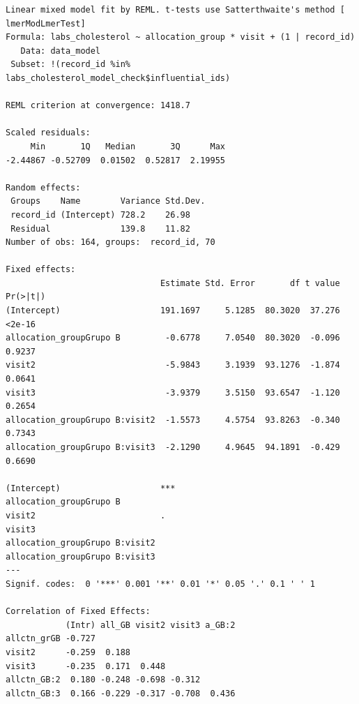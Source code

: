 \documentclass[
  letterpaper,
  DIV=11,
  numbers=noendperiod]{scrartcl}
\newenvironment{Shaded}{\begin{snugshade}}{\end{snugshade}}
\newcommand{\NormalTok}[1]{\textcolor[rgb]{0.00,0.23,0.31}{#1}}
\newcommand{\SpecialCharTok}[1]{\textcolor[rgb]{0.37,0.37,0.37}{#1}}
\begin{document}
\begin{verbatim}
Linear mixed model fit by REML. t-tests use Satterthwaite's method [
lmerModLmerTest]
Formula: labs_cholesterol ~ allocation_group * visit + (1 | record_id)
   Data: data_model
 Subset: !(record_id %in% labs_cholesterol_model_check$influential_ids)

REML criterion at convergence: 1418.7

Scaled residuals: 
     Min       1Q   Median       3Q      Max 
-2.44867 -0.52709  0.01502  0.52817  2.19955 

Random effects:
 Groups    Name        Variance Std.Dev.
 record_id (Intercept) 728.2    26.98   
 Residual              139.8    11.82   
Number of obs: 164, groups:  record_id, 70

Fixed effects:
                               Estimate Std. Error       df t value Pr(>|t|)
(Intercept)                    191.1697     5.1285  80.3020  37.276   <2e-16
allocation_groupGrupo B         -0.6778     7.0540  80.3020  -0.096   0.9237
visit2                          -5.9843     3.1939  93.1276  -1.874   0.0641
visit3                          -3.9379     3.5150  93.6547  -1.120   0.2654
allocation_groupGrupo B:visit2  -1.5573     4.5754  93.8263  -0.340   0.7343
allocation_groupGrupo B:visit3  -2.1290     4.9645  94.1891  -0.429   0.6690
                                  
(Intercept)                    ***
allocation_groupGrupo B           
visit2                         .  
visit3                            
allocation_groupGrupo B:visit2    
allocation_groupGrupo B:visit3    
---
Signif. codes:  0 '***' 0.001 '**' 0.01 '*' 0.05 '.' 0.1 ' ' 1

Correlation of Fixed Effects:
            (Intr) all_GB visit2 visit3 a_GB:2
allctn_grGB -0.727                            
visit2      -0.259  0.188                     
visit3      -0.235  0.171  0.448              
allctn_GB:2  0.180 -0.248 -0.698 -0.312       
allctn_GB:3  0.166 -0.229 -0.317 -0.708  0.436
\end{verbatim}

\begin{Shaded}
\end{Shaded}
\end{document}
